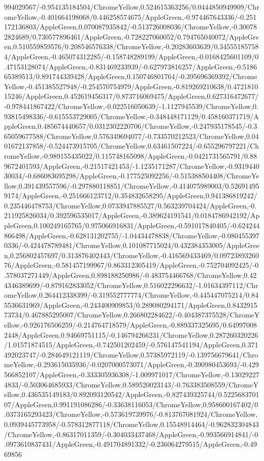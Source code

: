{\begin{tikzternal}
994029567/-0.954135184504/ChromeYellow,0.524615363256/0.0444850949909/ChromeYellow,-0.401664198068/0.446258574675/AppleGreen,-0.974467643336/-0.251172136803/AppleGreen,0.070087935842/-0.513726008036/ChromeYellow,-0.300782824689/0.730577896461/AppleGreen,-0.728227060052/0.794765040072/AppleGreen,0.510559859576/0.208546576338/ChromeYellow,-0.20283603639/0.345551857584/AppleGreen,-0.465074312285/-0.158748289199/AppleGreen,-0.0168425601109/0.47153128074/AppleGreen,-0.831469233939/-0.627973816257/AppleGreen,-0.518665389513/0.891744339428/AppleGreen,0.150746801764/-0.395696369392/ChromeYellow,-0.451385527948/-0.254570754979/AppleGreen,-0.819269210638/0.472181015246/AppleGreen,0.452619456317/0.873716069475/AppleGreen,0.627316472677/-0.978441867422/ChromeYellow,-0.022516050639/-1.1127945539/ChromeYellow,0.93815498336/-0.615553729005/ChromeYellow,-0.348448171129/0.458160371719/AppleGreen,0.485674440657/0.0312302220706/ChromeYellow,-0.247935178545/-0.365059677588/ChromeYellow,0.576349694077/-0.733570212523/ChromeYellow,0.0401672137858/-0.524473915705/ChromeYellow,0.63461507224/-0.655296797221/ChromeYellow,-0.989155435022/0.115748165098/AppleGreen,-0.0421731565791/0.889672401593/AppleGreen,-0.21517421453/-1.1235171287/ChromeYellow,-0.931944030034/-0.686083695298/AppleGreen,-0.177525092256/-0.515388504408/ChromeYellow,0.391439557596/-0.297880118851/ChromeYellow,-0.414075989003/0.526914959174/AppleGreen,-0.251666123712/0.354832658295/AppleGreen,0.941386819242/0.235446478753/ChromeYellow,0.0733947885527/0.563239704424/AppleGreen,-0.211925826034/0.392596535017/AppleGreen,-0.389624191541/0.0184786942192/AppleGreen,0.100249165765/0.975066916831/AppleGreen,-0.591017840405/-0.624244866498/AppleGreen,-0.628131202755/-1.04434478838/ChromeYellow,-0.0804553970336/-0.424478789481/ChromeYellow,0.101087715024/0.432384353005/AppleGreen,0.256802457697/0.313876402443/ChromeYellow,-0.416569433469/0.0972389326076/AppleGreen,-0.581457199967/0.863312305419/AppleGreen,-0.752704092425/-0.578037271449/AppleGreen,0.898188250986/-0.483754466768/ChromeYellow,0.424346389699/-0.879162833052/ChromeYellow,0.516022296632/-1.01634397112/ChromeYellow,0.264412338399/-0.319552777774/ChromeYellow,-0.445447075214/0.845536631969/AppleGreen,-0.243400909853/0.289080294171/AppleGreen,0.843291573734/0.467885295007/ChromeYellow,0.266802284622/-0.404387375528/ChromeYellow,-0.926176506259/-0.214764718579/AppleGreen,-0.889337325695/0.649970082448/AppleGreen,0.94669751115/-0.146794266231/ChromeYellow,0.287260320226/1.01571874515/AppleGreen,-0.742501202459/-0.576147541194/AppleGreen,0.371492023747/-0.284649121119/ChromeYellow,0.57385972119/-0.139756679641/ChromeYellow,-0.293615035936/-0.0207000573071/AppleGreen,-0.390980453693/-0.429566852107/AppleGreen,-0.333305936308/-1.009971017/ChromeYellow,-0.130292274833/-0.503064685933/ChromeYellow,0.589520023143/-0.763383508559/ChromeYellow,0.436535149183/0.892093120542/AppleGreen,-0.827439325744/0.522568370107/AppleGreen,0.991191086286/-0.33638116053/ChromeYellow,0.958600167402/0.0373165293423/ChromeYellow,-0.573619739976/-0.813767081924/ChromeYellow,0.0939445773958/-0.578312877118/ChromeYellow,0.15548914464/-0.962832304843/ChromeYellow,-0.86317011359/-0.304033437468/AppleGreen,-0.993566914841/-0.0973610837431/AppleGreen,-0.491704891332/-0.236064279515/AppleGreen,-0.4969856
\end{tikzternal}}
